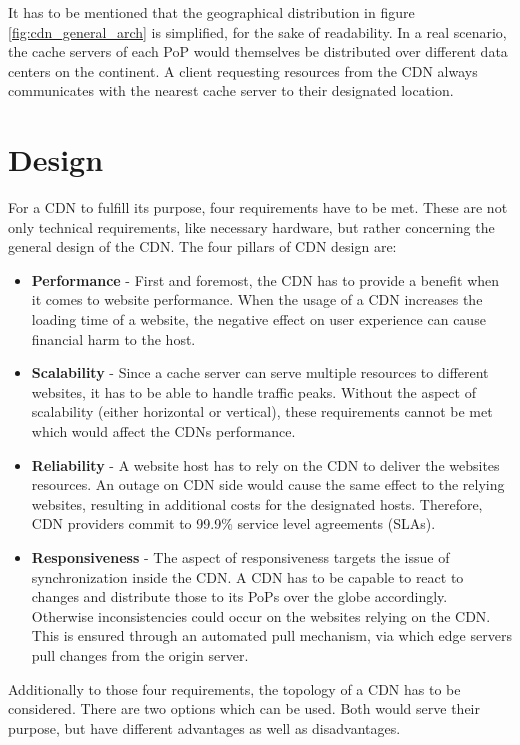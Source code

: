 It has to be mentioned that the geographical distribution in figure \ref{fig:cdn_general_arch} is simplified, for the sake of readability. In a real scenario, the cache servers of each PoP would themselves be distributed over different data centers on the continent. A client requesting resources from the CDN always communicates with the nearest cache server to their designated location.\cite{cdn_general}

\section{Design}

For a CDN to fulfill its purpose, four requirements have to be met. These are not only technical requirements, like necessary hardware, but rather concerning the general design of the CDN.
The four pillars of CDN design are:

\begin{itemize}
	\item \textbf{Performance} - First and foremost, the CDN has to provide a benefit when it comes to website performance. When the usage of a CDN increases the loading time of a website, the negative effect on user experience can cause financial harm to the host.\cite{cdn_general}
	\item \textbf{Scalability} - Since a cache server can serve multiple resources to different websites, it has to be able to handle traffic peaks. Without the aspect of scalability (either horizontal or vertical), these requirements cannot be met which would affect the CDNs performance.
	\item \textbf{Reliability} -  A website host has to rely on the CDN to deliver the websites resources. An outage on CDN side would cause the same effect to the relying websites, resulting in additional costs for the designated hosts. Therefore, CDN providers commit to 99.9\% service level agreements (SLAs).
	\item \textbf{Responsiveness} -  The aspect of responsiveness targets the issue of synchronization inside the CDN. A CDN has to be capable to react to changes and distribute those to its PoPs over the globe accordingly. Otherwise inconsistencies could occur on the websites relying on the CDN. This is ensured through an automated pull mechanism, via which edge servers pull changes from the origin server.\cite{cdn_origin_server}
\end{itemize}

Additionally to those four requirements, the topology of a CDN has to be considered. There are two options which can be used. Both would serve their purpose, but have different advantages as well as disadvantages. 

